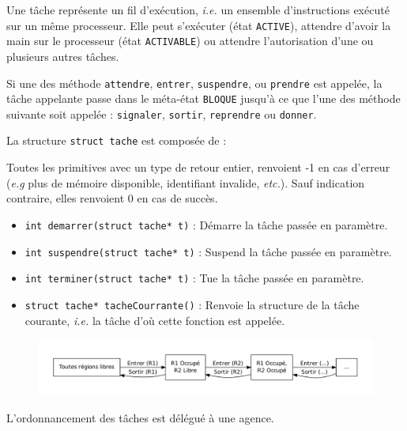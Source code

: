 {
Une tâche représente un fil d'exécution, \textsl{i.e.} un ensemble d'instructions exécuté sur un même processeur. Elle peut s'exécuter (état \lstinline {ACTIVE}), attendre d'avoir la main sur le processeur (état \lstinline {ACTIVABLE}) ou attendre l'autorisation d'une ou plusieurs autres tâches. 

Si une des méthode \lstinline {attendre}, \lstinline {entrer}, \lstinline {suspendre}, ou \lstinline {prendre} est appelée, la tâche appelante passe dans le méta-état \lstinline {BLOQUE} jusqu'à ce que l'une des méthode suivante soit appelée : \lstinline {signaler}, \lstinline {sortir}, \lstinline {reprendre} ou \lstinline {donner}.
}
{
La structure \lstinline {struct tache} est composée de :
}
{
Toutes les primitives avec un type de retour entier, renvoient -1 en cas d'erreur (\textsl{e.g} plus de mémoire disponible, identifiant invalide, \textsl{etc.}). Sauf indication contraire, elles renvoient 0 en cas de succès.

\begin{itemize}
	\item \lstinline {int demarrer(struct tache* t)} : Démarre la tâche passée en paramètre.
	\item \lstinline {int suspendre(struct tache* t)} : Suspend la tâche passée en paramètre. 
	\item \lstinline {int terminer(struct tache* t)} : Tue la tâche passée en paramètre.
	\item \lstinline {struct tache* tacheCourrante()} : Renvoie la structure de la tâche courante, \textsl{i.e.} la tâche d'où cette fonction est appelée.
\end{itemize}
}
{
\begin{figure} [htp]
\centering
\includegraphics[width=\textwidth]{img/etatTache.pdf}
\end{figure}
}
{L'ordonnancement des tâches est délégué à une agence.}
